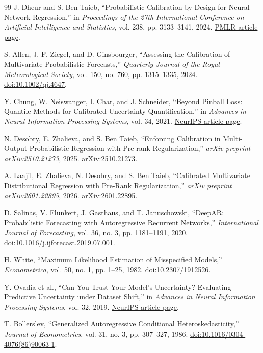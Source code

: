 \documentclass[11pt]{article}
\begin{document}
\begin{thebibliography}{99}
J. Dheur and S. Ben Taieb,
``Probabilistic Calibration by Design for Neural Network Regression,''
in \emph{Proceedings of the 27th International Conference on Artificial
Intelligence and Statistics}, vol. 238, pp. 3133--3141, 2024.
\href{https://proceedings.mlr.press/v238/dheur24a.html}{PMLR article page}.

S. Allen, J. F. Ziegel, and D. Ginsbourger,
``Assessing the Calibration of Multivariate Probabilistic Forecasts,''
\emph{Quarterly Journal of the Royal Meteorological Society}, vol. 150,
no. 760, pp. 1315--1335, 2024.
\href{https://doi.org/10.1002/qj.4647}{doi:10.1002/qj.4647}.

Y. Chung, W. Neiswanger, I. Char, and J. Schneider,
``Beyond Pinball Loss: Quantile Methods for Calibrated Uncertainty
Quantification,'' in \emph{Advances in Neural Information Processing Systems},
vol. 34, 2021.
\href{https://proceedings.neurips.cc/paper/2021/hash/5b168fdba5ee5ea262cc2d4c0b457697-Abstract.html}{NeurIPS article page}.

N. Desobry, E. Zhalieva, and S. Ben Taieb,
``Enforcing Calibration in Multi-Output Probabilistic Regression with Pre-rank
Regularization,'' \emph{arXiv preprint arXiv:2510.21273}, 2025.
\href{https://arxiv.org/abs/2510.21273}{arXiv:2510.21273}.

A. Laajil, E. Zhalieva, N. Desobry, and S. Ben Taieb,
``Calibrated Multivariate Distributional Regression with Pre-Rank
Regularization,'' \emph{arXiv preprint arXiv:2601.22895}, 2026.
\href{https://arxiv.org/abs/2601.22895}{arXiv:2601.22895}.

D. Salinas, V. Flunkert, J. Gasthaus, and T. Januschowski,
``DeepAR: Probabilistic Forecasting with Autoregressive Recurrent Networks,''
\emph{International Journal of Forecasting}, vol. 36, no. 3,
pp. 1181--1191, 2020.
\href{https://doi.org/10.1016/j.ijforecast.2019.07.001}{doi:10.1016/j.ijforecast.2019.07.001}.

H. White,
``Maximum Likelihood Estimation of Misspecified Models,''
\emph{Econometrica}, vol. 50, no. 1, pp. 1--25, 1982.
\href{https://doi.org/10.2307/1912526}{doi:10.2307/1912526}.

Y. Ovadia et al.,
``Can You Trust Your Model's Uncertainty? Evaluating Predictive Uncertainty
under Dataset Shift,'' in \emph{Advances in Neural Information Processing
Systems}, vol. 32, 2019.
\href{https://proceedings.neurips.cc/paper_files/paper/2019/hash/8558cb408c1d76621371888657d2eb1d-Abstract.html}{NeurIPS article page}.

T. Bollerslev,
``Generalized Autoregressive Conditional Heteroskedasticity,''
\emph{Journal of Econometrics}, vol. 31, no. 3, pp. 307--327, 1986.
\href{https://doi.org/10.1016/0304-4076(86)90063-1}{doi:10.1016/0304-4076(86)90063-1}.

\end{thebibliography}
\end{document}
